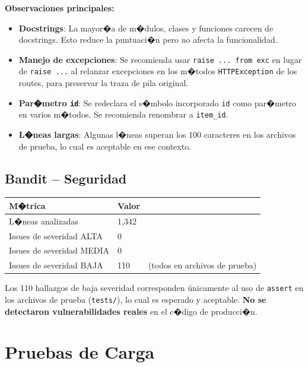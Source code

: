 \documentclass[12pt,a4paper]{article}
\begin{document}
\vspace{0.3cm}
\textbf{Observaciones principales:}

\begin{itemize}
  \item \textbf{Docstrings}: La mayor�a de m�dulos, clases y funciones carecen de
        docstrings. Esto reduce la puntuaci�n pero no afecta la funcionalidad.
  \item \textbf{Manejo de excepciones}: Se recomienda usar \texttt{raise ... from exc}
        en lugar de \texttt{raise ...} al relanzar excepciones en los m�todos
        \texttt{HTTPException} de los routes, para preservar la traza de pila original.
  \item \textbf{Par�metro \texttt{id}}: Se redeclara el s�mbolo incorporado \texttt{id}
        como par�metro en varios m�todos. Se recomienda renombrar a \texttt{item\_id}.
  \item \textbf{L�neas largas}: Algunas l�neas superan los 100 caracteres en los
        archivos de prueba, lo cual es aceptable en ese contexto.
\end{itemize}

\subsection{Bandit -- Seguridad}

\begin{tabularx}{\textwidth}{lXr}
  \toprule
  \textbf{M�trica} & \textbf{Valor} & \\
  \midrule
  L�neas analizadas & 1,342 & \\
  Issues de severidad ALTA & 0 & \\
  Issues de severidad MEDIA & 0 & \\
  Issues de severidad BAJA & 110 & (todos en archivos de prueba) \\
  \bottomrule
\end{tabularx}

\vspace{0.3cm}
Los 110 hallazgos de baja severidad corresponden \'unicamente al uso de
\texttt{assert} en los archivos de prueba (\texttt{tests/}), lo cual es
esperado y aceptable. \textbf{No se detectaron vulnerabilidades reales}
en el c�digo de producci�n.

\section{Pruebas de Carga}
\end{document}
